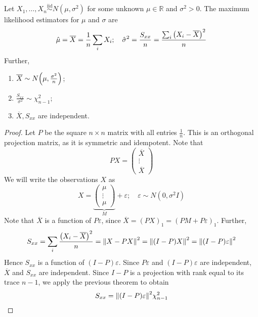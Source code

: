 \begin{theorem}
	Let \( X_1, \dots, X_n \overset{\text{iid}}{\sim} N(\mu,\sigma^2) \) for some unknown \( \mu \in \mathbb R \) and \( \sigma^2 > 0 \).
	The maximum likelihood estimators for \( \mu \) and \( \sigma \) are
	\[
		\hat \mu = \overline X = \frac{1}{n} \sum_i X_i;\quad \hat \sigma^2 = \frac{S_{xx}}{n} = \frac{\sum_i \qty(X_i - \overline X)^2}{n}
	\]
	Further,
	\begin{enumerate}
		\item \( \overline X \sim N\qty(\mu, \frac{\sigma^2}{n}) \);
		\item \( \frac{S_{xx}}{\sigma^2} \sim \chi^2_{n-1} \);
		\item \( \overline X, S_{xx} \) are independent.
	\end{enumerate}
\end{theorem}
\begin{proof}
	Let \( P \) be the square \( n \times n \) matrix with all entries \( \frac{1}{n} \).
	This is an orthogonal projection matrix, as it is symmetric and idempotent.
	Note that
	\[
		PX = \begin{pmatrix}
			\overline X \\
			\vdots      \\
			\overline X
		\end{pmatrix}
	\]
	We will write the observations \( X \) as
	\[
		X = \underbrace{\begin{pmatrix}
				\mu    \\
				\vdots \\
				\mu
			\end{pmatrix}}_{M} + \varepsilon;\quad \varepsilon \sim N(0,\sigma^2 I)
	\]
	Note that \( \overline X \) is a function of \( P \varepsilon \), since \( \overline X = (PX)_1 = (PM + P\varepsilon)_1 \).
	Further,
	\[
		S_{xx} = \sum_i \frac{\qty(X_i - \overline X)^2}{n} = \norm{X - PX}^2 = \norm{(I-P)X}^2 = \norm{(I-P)\varepsilon}^2
	\]
	Hence \( S_{xx} \) is a function of \( (I-P)\varepsilon \).
	Since \( P\varepsilon \) and \( (I-P)\varepsilon \) are independent, \( \overline X \) and \( S_{xx} \) are independent.
	Since \( I-P \) is a projection with rank equal to its trace \( n-1 \), we apply the previous theorem to obtain
	\[
		S_{xx} = \norm{(I-P)\varepsilon}^2 \chi^2_{n-1}
	\]
\end{proof}

